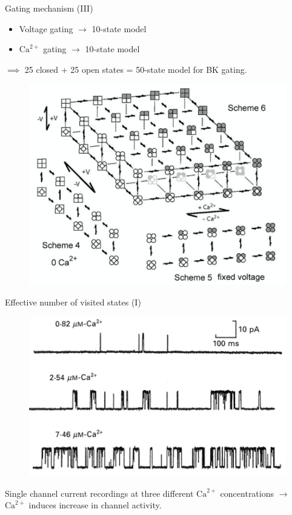 \documentclass{beamer}
\newcommand{\ca}{\text{Ca}^{2+}}
\begin{document}
\begin{frame}{Gating mechanism (III)}
\begin{minipage}{.46\textwidth}
\begin{itemize}
	\item Voltage gating $\rightarrow$ 10-state model

	\item $\ca$ gating $\rightarrow$ 10-state model
\end{itemize}
\bigskip
$\implies$ 25 closed + 25 open states = 50-state model for BK gating.
\end{minipage}
\begin{minipage}{.52\textwidth}
\begin{figure}
\centering
\includegraphics[width=\textwidth]{50_State_Model.png}
\end{figure}
\end{minipage}
\end{frame}



\begin{frame}{Effective number of visited states (I)}
\begin{figure}
\centering
\includegraphics[width=.7\textwidth]{Ca_activation_v_vs_time.png}
\end{figure}

Single channel current recordings at three different $\ca$ concentrations $\rightarrow$ $\ca$ induces increase in channel activity.
\end{frame}
\end{document}

